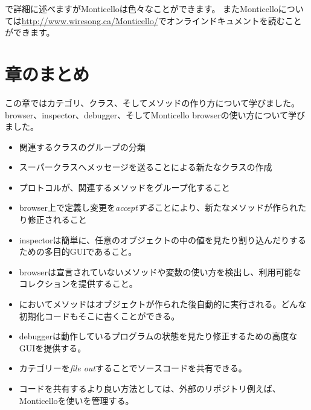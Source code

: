 \documentclass[a4paper,10pt,twoside]{book}
\begin{document}
で詳細に述べますがMonticelloは色々なことができます。
またMonticelloについては\url{http://www.wiresong.ca/Monticello/}でオンラインドキュメントを読むことができます。

\section{章のまとめ}
この章ではカテゴリ、クラス、そしてメソッドの作り方について学びました。
browser、inspector、debugger、そしてMonticello browserの使い方について学びました。

\begin{itemize}
  \item 関連するクラスのグループの分類
  \item スーパークラスへメッセージを送ることによる新たなクラスの作成
  \item プロトコルが、関連するメソッドをグループ化すること
  \item browser上で定義し変更を\emph{acceptする}ことにより、新たなメソッドが作られたり修正されること
  \item inspectorは簡単に、任意のオブジェクトの中の値を見たり割り込んだりするための多目的GUIであること。
  \item browserは宣言されていないメソッドや変数の使い方を検出し、利用可能なコレクションを提供すること。
  \item \pharo{}においてメソッドはオブジェクトが作られた後自動的に実行される。どんな初期化コードもそこに書くことができる。
  \item debuggerは動作しているプログラムの状態を見たり修正するための高度なGUIを提供する。
  \item カテゴリーを\emph{file out}することでソースコードを共有できる。
  \item コードを共有するより良い方法としては、外部のリポジトリ例えば、Monticelloを使いを管理する。
\end{itemize}

\ifx\wholebook\relax\else
\end{document}
